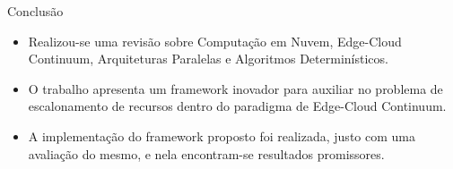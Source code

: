 \begin{frame}{Conclusão}
    \begin{itemize}
        \item Realizou-se uma revisão sobre Computação em Nuvem, Edge-Cloud Continuum, Arquiteturas Paralelas e Algoritmos Determinísticos.
        \item O trabalho apresenta um framework inovador para auxiliar no problema de escalonamento de recursos dentro do paradigma de Edge-Cloud Continuum.
        \item A implementação do framework proposto foi realizada, justo com uma avaliação do mesmo, e nela encontram-se resultados promissores.
    \end{itemize}
\end{frame}